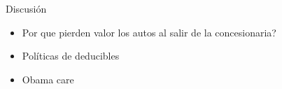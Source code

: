 \documentclass{beamer}
\begin{document}
\begin{frame}{Discusión}
    \begin{itemize}
        \item Por que pierden valor los autos al salir de la concesionaria?
        \item Políticas de deducibles
        \item Obama care
    \end{itemize}
\end{frame}



\end{document}
